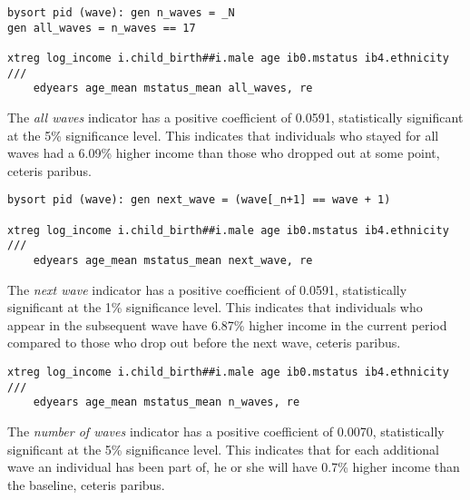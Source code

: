 

\begin{verbatim}
bysort pid (wave): gen n_waves = _N
gen all_waves = n_waves == 17

xtreg log_income i.child_birth##i.male age ib0.mstatus ib4.ethnicity ///
    edyears age_mean mstatus_mean all_waves, re
\end{verbatim}


The \emph{all waves} indicator has a positive coefficient of 0.0591, statistically significant at the 5\% significance level. This indicates that individuals who stayed for all waves had a 6.09\% higher income than those who dropped out at some point, ceteris paribus.

\begin{verbatim}
bysort pid (wave): gen next_wave = (wave[_n+1] == wave + 1)

xtreg log_income i.child_birth##i.male age ib0.mstatus ib4.ethnicity ///
    edyears age_mean mstatus_mean next_wave, re
\end{verbatim}


The \emph{next wave} indicator has a positive coefficient of 0.0591, statistically significant at the 1\% significance level. This indicates that individuals who appear in the subsequent wave have 6.87\% higher income in the current period compared to those who drop out before the next wave, ceteris paribus.

\begin{verbatim}
xtreg log_income i.child_birth##i.male age ib0.mstatus ib4.ethnicity ///
    edyears age_mean mstatus_mean n_waves, re
\end{verbatim}


The \emph{number of waves} indicator has a positive coefficient of 0.0070, statistically significant at the 5\% significance level. This indicates that for each additional wave an individual has been part of, he or she will have 0.7\% higher income than the baseline, ceteris paribus.

